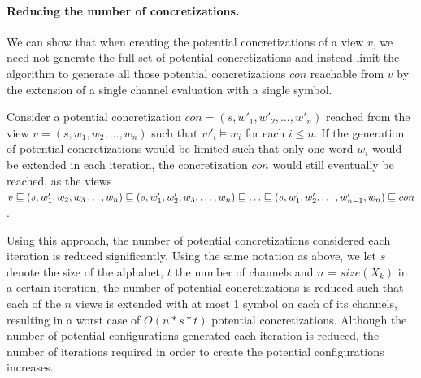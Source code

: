 \paragraph{Reducing the number of concretizations.}
We can show that when creating the potential concretizations of a view $v$, we need not generate the full set of potential concretizations and instead limit the algorithm to generate all those potential concretizations $con$ reachable from $v$ by the extension of a single channel evaluation with a single symbol.

Consider a potential concretization $con = (s, w'_1, w'_2, \ldots, w'_n)$ reached from the view $v = (s, w_1, w_2, \ldots, w_n)$ such that $w'_i \models w_i$ for each $i \leq n$. If the generation of potential concretizations would be limited such that only one word $w_i$ would be extended in each iteration, the concretization $con$ would still eventually be reached, as the views $v \sqsubseteq (s, w'_1, w_2, w_3 \ldots, w_n) \sqsubseteq (s, w'_1, w'_2, w_3, \ldots, w_n) \sqsubseteq \ldots \sqsubseteq (s, w'_1, w'_2, \ldots, w'_{n-1}, w_n) \sqsubseteq con$.

Using this approach, the number of potential concretizations considered each iteration is reduced significantly. Using the same notation as above, we let $s$ denote the size of the alphabet, $t$ the number of channels and $n$ = $size(X_k)$ in a certain iteration, the number of potential concretizations is reduced such that each of the $n$ views is extended with at most 1 symbol on each of its channels, resulting in a worst case of $O(n*s*t)$ potential concretizations. Although the number of potential configurations generated each iteration is reduced, the number of iterations required in order to create the potential configurations increases.

